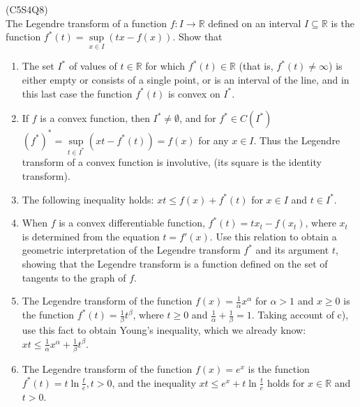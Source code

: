 \begin{prb}
    (C5S4Q8) \\
    The Legendre transform of a function $f : I \to \mathbb{R}$ defined on an interval $I \subseteq \mathbb{R}$ is the function $f^*(t) = \sup\limits_{x \in I} (t x - f(x))$. 
    Show that
    \begin{enumerate}
        \item[a)] The set $I^*$ of values of $t \in \mathbb{R}$ for which $f^*(t) \in \mathbb{R}$ (that is, $f^*(t) \neq \infty$) is either empty or consists of a single point, 
        or is an interval of the line, and in this last case the function $f^*(t)$ is convex on $I^*$.
        \item[b)] If $f$ is a convex function, then $I^* \neq \emptyset$, and for $f^* \in C(I^*)$ $(f^*)^* = \sup\limits_{t \in I^*} \left( x t - f^*(t) \right) = f(x)$ for any $x \in I$. 
        Thus the Legendre transform of a convex function is involutive, (its square is the identity transform).
        \item[c)] The following inequality holds: $x t \leq f(x) + f^*(t)$ for $x \in I$ and $t \in I^*$.
        \item[d)] When $f$ is a convex differentiable function, $f^*(t) = t x_t - f(x_t)$, where $x_t$ is determined from the equation $t = f'(x)$. Use this relation to obtain 
        a geometric interpretation of the Legendre transform $f^*$ and its argument $t$, showing that the Legendre transform is a function defined on the set of tangents to the 
        graph of $f$.
        \item[e)] The Legendre transform of the function $f(x) = \frac{1}{\alpha} x^{\alpha}$ for $\alpha > 1$ and $x \geq 0$ is the function $f^*(t) = \frac{1}{\beta} t^{\beta}$, 
        where $t \geq 0$ and $\frac{1}{\alpha} + \frac{1}{\beta} = 1$. Taking account of c), use this fact to obtain Young's inequality, which we already know: $x t \leq 
        \frac{1}{\alpha} x^{\alpha} + \frac{1}{\beta} t^{\beta}$.
        \item[f)] The Legendre transform of the function $f(x) = e^{x}$ is the function $f^*(t) = t \ln \frac{t}{e}, t > 0$, and the inequality $x t \leq e^{x} + t \ln \frac{t}{e}$ 
        holds for $x \in \mathbb{R}$ and $t > 0$.
    \end{enumerate}
\end{prb}
